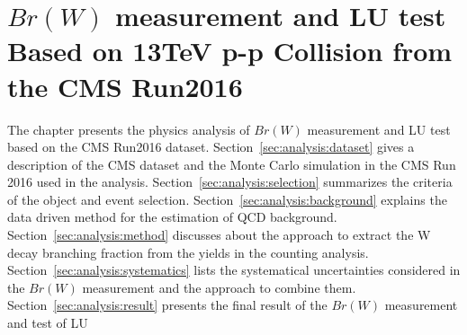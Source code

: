 \chapter{$Br(W)$ measurement and LU test Based on 13TeV p-p Collision from the CMS Run2016}
\label{sec:analysis}


The chapter presents the physics analysis of $Br(W)$ measurement and LU test based on the CMS Run2016 dataset. Section~\ref{sec:analysis:dataset} gives a description of the CMS dataset and the Monte Carlo simulation in the CMS Run 2016 used in the analysis. Section~\ref{sec:analysis:selection} summarizes the criteria of the object and event selection. Section~\ref{sec:analysis:background} explains the data driven method for the estimation of QCD background. Section~\ref{sec:analysis:method} discusses about the approach to extract the W decay branching fraction from the yields in the counting analysis. Section~\ref{sec:analysis:systematics} lists the systematical uncertainties considered in the $Br(W)$ measurement and the approach to combine them. Section~\ref{sec:analysis:result} presents the final result of the $Br(W)$ measurement and test of LU 



\newpage

\newpage

\newpage

\newpage

\newpage

\newpage

